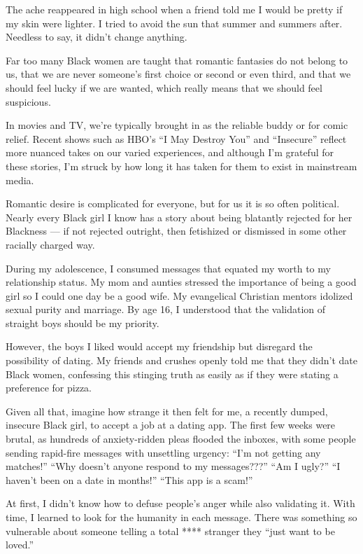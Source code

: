 The ache reappeared in high school when a friend told me I would be
pretty if my skin were lighter. I tried to avoid the sun that summer and
summers after. Needless to say, it didn't change anything.

Far too many Black women are taught that romantic fantasies do not
belong to us, that we are never someone's first choice or second or even
third, and that we should feel lucky if we are wanted, which really
means that we should feel suspicious.

In movies and TV, we're typically brought in as the reliable buddy or
for comic relief. Recent shows such as HBO's ``I May Destroy You'' and
``Insecure'' reflect more nuanced takes on our varied experiences, and
although I'm grateful for these stories, I'm struck by how long it has
taken for them to exist in mainstream media.

Romantic desire is complicated for everyone, but for us it is so often
political. Nearly every Black girl I know has a story about being
blatantly rejected for her Blackness --- if not rejected outright, then
fetishized or dismissed in some other racially charged way.

During my adolescence, I consumed messages that equated my worth to my
relationship status. My mom and aunties stressed the importance of being
a good girl so I could one day be a good wife. My evangelical Christian
mentors idolized sexual purity and marriage. By age 16, I understood
that the validation of straight boys should be my priority.

However, the boys I liked would accept my friendship but disregard the
possibility of dating. My friends and crushes openly told me that they
didn't date Black women, confessing this stinging truth as easily as if
they were stating a preference for pizza.

Given all that, imagine how strange it then felt for me, a recently
dumped, insecure Black girl, to accept a job at a dating app. The first
few weeks were brutal, as hundreds of anxiety-ridden pleas flooded the
inboxes, with some people sending rapid-fire messages with unsettling
urgency: ``I'm not getting any matches!'' ``Why doesn't anyone respond
to my messages???'' ``Am I ugly?'' ``I haven't been on a date in
months!'' ``This app is a scam!''

At first, I didn't know how to defuse people's anger while also
validating it. With time, I learned to look for the humanity in each
message. There was something so vulnerable about someone telling a total
**** stranger they ``just want to be loved.''

